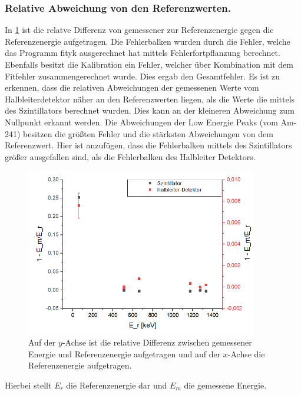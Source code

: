 \subsubsection{ Relative Abweichung von den Referenzwerten.}
In \cref{ee} ist die relatve Differenz von gemessener zur Referenzenergie gegen die Referenzenergie aufgetragen. Die Fehlerbalken wurden durch die Fehler, welche das Programm fityk ausgerechnet hat mittels Fehlerfortpflanzung berechnet. Ebenfalls besitzt die Kalibration ein Fehler, welcher über Kombination mit dem Fitfehler zusammengerechnet wurde. Dies ergab den Gesamtfehler. Es ist zu erkennen, dass die relativen Abweichungen der gemessenen Werte vom Halbleiterdetektor näher an den Referenzwerten liegen, als die Werte die mittels des Szintillators berechnet wurden. Dies kann an der kleineren Abweichung zum Nullpunkt erkannt werden. Die Abweichungen der Low Energie Peaks (vom Am-241) besitzen die größten Fehler und die stärksten Abweichungen von dem Referenzwert. Hier ist anzufügen, dass die Fehlerbalken mittels des Szintillators größer ausgefallen sind, als die Fehlerbalken des Halbleiter Detektors.
\begin{figure}[h!]
	\centering
	\includegraphics[width=0.9\textwidth]{1minEdurchE.png}
	\caption{Auf der $y$-Achse ist die relative Differenz zwischen gemessener Energie und Referenzenergie aufgetragen und auf der $x$-Achse die Referenzenergie aufgetragen.}
	\label{ee}
\end{figure}
Hierbei stellt $E_r$ die Referenzenergie dar und $E_m$ die gemessene Energie.
